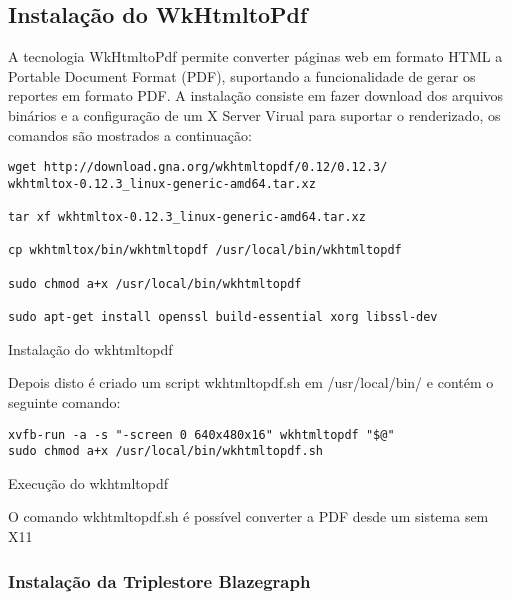 \subsection*{Instalação do \foreignlanguage{english}{WkHtmltoPdf}}

A tecnologia \foreignlanguage{english}{WkHtmltoPdf} permite converter
páginas web em formato \foreignlanguage{english}{HTML} a \foreignlanguage{english}{Portable
Document Format (PDF}),
suportando a funcionalidade de gerar os reportes em formato PDF. A
instalação consiste em fazer download dos arquivos binários e a configuração
de um X Server Virual para suportar o renderizado, os comandos são
mostrados a continuação:

\begin{algorithm}[h]
\begin{lstlisting}
wget http://download.gna.org/wkhtmltopdf/0.12/0.12.3/
wkhtmltox-0.12.3_linux-generic-amd64.tar.xz

tar xf wkhtmltox-0.12.3_linux-generic-amd64.tar.xz

cp wkhtmltox/bin/wkhtmltopdf /usr/local/bin/wkhtmltopdf

sudo chmod a+x /usr/local/bin/wkhtmltopdf

sudo apt-get install openssl build-essential xorg libssl-dev
\end{lstlisting}
\caption{Instalação do wkhtmltopdf }
\end{algorithm}

Depois disto é criado um \foreignlanguage{english}{script wkhtmltopdf.sh}
em \foreignlanguage{english}{/usr/local/bin/} e contém o seguinte
comando:

\begin{algorithm}[h]
\begin{lstlisting}
xvfb-run -a -s "-screen 0 640x480x16" wkhtmltopdf "$@"
sudo chmod a+x /usr/local/bin/wkhtmltopdf.sh 
\end{lstlisting}
\caption{Execução do wkhtmltopdf}
\end{algorithm}

O comando \foreignlanguage{english}{wkhtmltopdf.sh} é possível converter
a \foreignlanguage{english}{PDF} desde um sistema sem X11

\subsubsection*{Instalação da \foreignlanguage{english}{Triplestore Blazegraph}}

